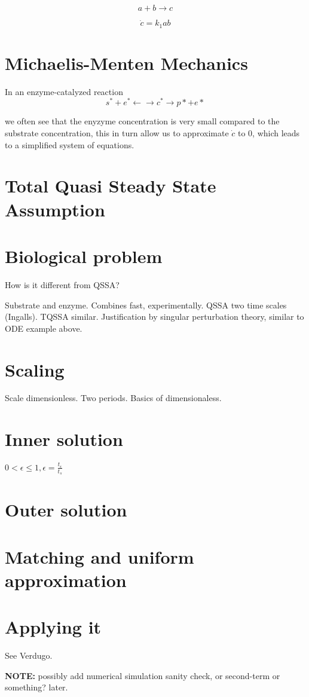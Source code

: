 \documentclass[12pt]{report}
\begin{document}
\begin{equation}
a+b \rightarrow c
\end{equation}

\begin{equation}
\dot{c} = k_1 ab
\end{equation}

\section{Michaelis-Menten Mechanics}

In an enzyme-catalyzed reaction $$ s^* + e^* \leftarrow \rightarrow
c^* \rightarrow p*+e* $$

we often see that the enyzyme concentration is very small compared to
the substrate concentration, this in turn allow us to approximate $\dot{c}$ to
0, which leads to a simplified system of equations.

\section{Total Quasi Steady State Assumption}


\section{Biological problem}

How is it different from QSSA?

Substrate and enzyme. Combines fast, experimentally. QSSA two time
scales (Ingalls). TQSSA similar. Justification by singular
perturbation theory, similar to ODE example above.

\section{Scaling}

Scale dimensionless. Two periods. Basics of dimensionaless.

\section{Inner solution}

$0 < \epsilon \leq 1, \epsilon = \frac{t_{\epsilon}}{t_{s}}$

\section{Outer solution}

\section{Matching and uniform approximation}

\section{Applying it}

See Verdugo.

\textbf{NOTE:} possibly add numerical simulation sanity check, or second-term or
something? later.


\end{document}
